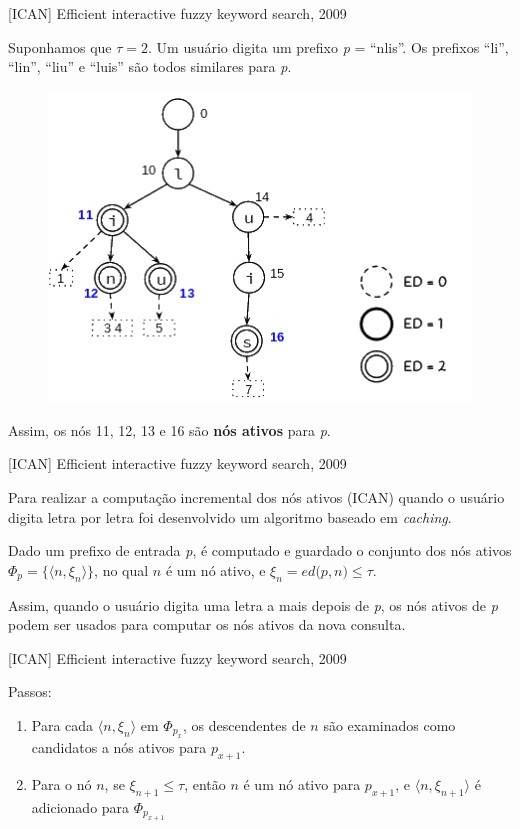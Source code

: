 \documentclass[11pt]{beamer}
\begin{document}
\begin{frame}{[ICAN] Efficient interactive fuzzy keyword search, 2009}

    \small
    Suponhamos que $\tau = 2$. Um usuário digita um prefixo \textit{p} = ``nlis''. Os prefixos ``li'', ``lin'', ``liu'' e ``luis'' são todos similares para \textit{p}.
    
    \begin{figure}
      \includegraphics[scale=0.45]{pictures/ican_7.png}
      \centering
    \end{figure}
    
    Assim, os nós 11, 12, 13 e 16 são \textbf{nós ativos} para \textit{p}.
    
\end{frame}

\begin{frame}{[ICAN] Efficient interactive fuzzy keyword search, 2009}

    Para realizar a computação incremental dos nós ativos (ICAN) quando o usuário digita letra por letra foi desenvolvido um algoritmo baseado em \textit{caching}. \pause
    
    Dado um prefixo de entrada \textit{p}, é computado e guardado o conjunto dos nós ativos $\Phi_p = \big\{ \big \langle n, \xi_n \big \rangle \big\}$, no qual $n$ é um nó ativo, e $\xi_n = ed \big(p, n \big) \le \tau$.  \pause
    
    Assim, quando o usuário digita uma letra a mais depois de \textit{p}, os nós ativos de \textit{p} podem ser usados para computar os nós ativos da nova consulta.
    
\end{frame}

\begin{frame}{[ICAN] Efficient interactive fuzzy keyword search, 2009}

    Passos:
    
    \begin{enumerate}
        \item Para cada $\big\langle n, \xi_{n} \big\rangle$ em $\Phi_{p_x}$, os descendentes de $n$ são examinados como candidatos a nós ativos para $p_{x+1}$.
        \item Para o nó $n$, se $\xi_{n+1} \le \tau$, então $n$ é um nó ativo  para $p_{x+1}$, e $\big\langle n, \xi_{n+1} \big\rangle$ é adicionado para $\Phi_{p_{x+1}}$
    \end{enumerate}
\end{frame}
\end{document}
